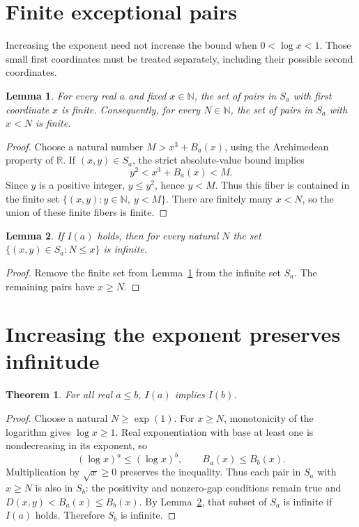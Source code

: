 \documentclass[11pt]{article}
\newtheorem{lemma}{Lemma}
\newtheorem{theorem}{Theorem}
\newcommand{\N}{\mathbb N}
\newcommand{\R}{\mathbb R}
\begin{document}
\section{Finite exceptional pairs}
Increasing the exponent need not increase the bound when $0<\log x<1$.
Those small first coordinates must be treated separately, including their
possible second coordinates.

\begin{lemma}\label{lem:fiber}
For every real $a$ and fixed $x\in\N$, the set of pairs in $S_a$ with first
coordinate $x$ is finite. Consequently, for every $N\in\N$, the set of pairs
in $S_a$ with $x<N$ is finite.
\end{lemma}
\begin{proof}
Choose a natural number $M>x^3+B_a(x)$, using the Archimedean property of
$\R$. If $(x,y)\in S_a$, the strict absolute-value bound implies
\[
 y^2<x^3+B_a(x)<M.
\]
Since $y$ is a positive integer, $y\le y^2$, hence $y<M$. Thus this fiber is
contained in the finite set $\{(x,y):y\in\N,\ y<M\}$.
There are finitely many $x<N$, so the union of these finite fibers is finite.
\end{proof}

\begin{lemma}\label{lem:tail}
If $I(a)$ holds, then for every natural $N$ the set
$\{(x,y)\in S_a:N\le x\}$ is infinite.
\end{lemma}
\begin{proof}
Remove the finite set from Lemma~\ref{lem:fiber} from the infinite set $S_a$.
The remaining pairs have $x\ge N$.
\end{proof}

\section{Increasing the exponent preserves infinitude}
\begin{theorem}\label{thm:mono}
For all real $a\le b$, $I(a)$ implies $I(b)$.
\end{theorem}
\begin{proof}
Choose a natural $N\ge\exp(1)$. For $x\ge N$, monotonicity of the logarithm
gives $\log x\ge1$. Real exponentiation with base at least one is
nondecreasing in its exponent, so
\[
 (\log x)^a\le(\log x)^b,
 \qquad B_a(x)\le B_b(x).
\]
Multiplication by $\sqrt{x}\ge0$ preserves the inequality. Thus each pair in
$S_a$ with $x\ge N$ is also in $S_b$: the positivity and nonzero-gap
conditions remain true and $D(x,y)<B_a(x)\le B_b(x)$.
By Lemma~\ref{lem:tail}, that subset of $S_a$ is infinite if $I(a)$ holds.
Therefore $S_b$ is infinite.
\end{proof}
\end{document}
